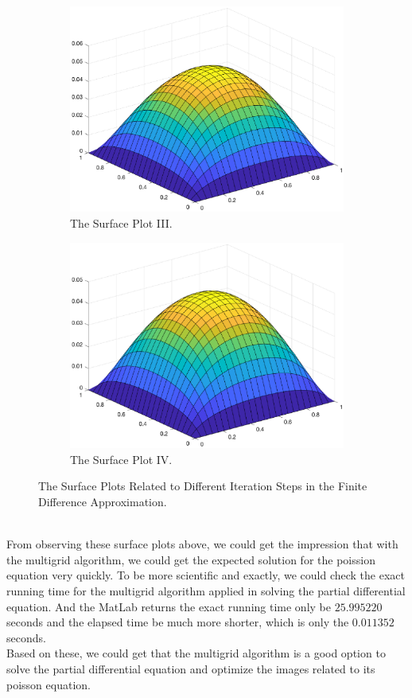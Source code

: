 \documentclass [a4paper, 12pt]{article}
\begin{document}
\begin {figure} [h!]
\begin {subfigure} [b] {0.3\linewidth}
      \includegraphics [width=\linewidth] {fda_3.eps}
      \caption {The Surface Plot III.}
\end {subfigure}
\begin {subfigure} [b] {0.3\linewidth}
      \includegraphics [width=\linewidth] {fda_4.eps}
      \caption {The Surface Plot IV.}
\end {subfigure}
\caption {The Surface Plots Related to Different Iteration Steps in the Finite Difference Approximation.}
\label {fig: surface}
\end {figure}
\\From observing these surface plots above, we could get the impression that with the multigrid algorithm, we could get the expected solution for the poission equation very quickly. To be more scientific and exactly, we could check the exact running time for the multigrid algorithm applied in solving the partial differential equation. And the MatLab returns the exact running time only be $25.995220$ seconds and the elapsed time be much more shorter, which is only the $0.011352$ seconds. \\
Based on these, we could get that the multigrid algorithm is a good option to solve the partial differential equation and optimize the images related to its poisson equation.
\end{document}
